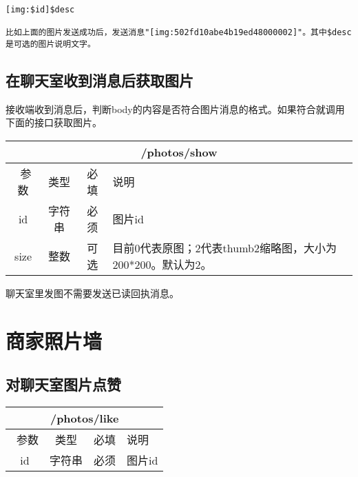 \documentclass[cs4size]{ctexartutf8}
\begin{document}
\begin{verbatim}
[img:$id]$desc

比如上面的图片发送成功后，发送消息"[img:502fd10abe4b19ed48000002]"。其中$desc是可选的图片说明文字。
\end{verbatim}

\subsection{在聊天室收到消息后获取图片}

接收端收到消息后，判断body的内容是否符合图片消息的格式。如果符合就调用下面的接口获取图片。

\begin{table}[H]
   \begin{center}
\begin{tabular}{|c|c|c|p{12cm}|}
\hline
\multicolumn{4}{|c|}{/photos/show} \\
\hline\hline
 \  参数  & 类型 & 必填 &  说明  \\
  \hline
 id  & 字符串 & 必须 & 图片id\\
\hline
 size  & 整数 & 可选 &  目前0代表原图；2代表thumb2缩略图，大小为200*200。默认为2。\\ 
\hline
\end{tabular}
   \end{center}
\end{table}

聊天室里发图不需要发送已读回执消息。

\section{商家照片墙}
\subsection{对聊天室图片点赞}

\begin{table}[H]
   \begin{center}
\begin{tabular}{|c|c|c|p{12cm}|}
\hline
\multicolumn{4}{|c|}{/photos/like} \\
\hline\hline
 \  参数  & 类型 & 必填 &  说明  \\
  \hline
 id  & 字符串 & 必须 & 图片id\\
\hline
\end{tabular}
   \end{center}
\end{table}
\end{document}
